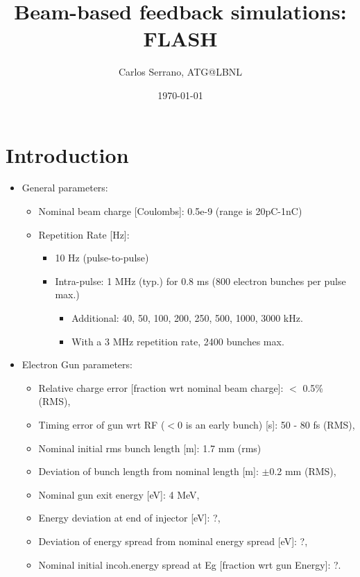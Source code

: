 \documentclass[a4paper,12pt]{article}
\title{Beam-based feedback simulations: FLASH}
\author{Carlos Serrano, ATG@LBNL}
\date{\today}
\begin{document}
\maketitle
\setcounter{tocdepth}{1}


\section{Introduction}

\begin{itemize}
  \item General parameters:
  \begin{itemize}
   \item Nominal beam charge [Coulombs]: 0.5e-9 (range is 20pC-1nC)
   \item Repetition Rate [Hz]:
   \begin{itemize}
    \item 10 Hz (pulse-to-pulse)
    \item Intra-pulse: 1 MHz (typ.) for 0.8 ms (800 electron bunches per pulse max.)
    \begin{itemize}
     \item Additional: 40, 50, 100, 200, 250, 500, 1000, 3000 kHz.
     \item With a 3 MHz repetition rate, 2400 bunches max.
    \end{itemize}
   \end{itemize}
  \end{itemize}
  \item Electron Gun parameters:
  \begin{itemize}
    \item Relative charge error [fraction wrt nominal beam charge]: $<$ 0.5\% (RMS),
    \item Timing error of gun wrt RF ($<$0 is an early bunch) [s]: 50 - 80 fs (RMS),
    \item Nominal initial rms bunch length [m]: 1.7 mm (rms)
    \item Deviation of bunch length from nominal length [m]: $\pm$0.2 mm (RMS),
    \item Nominal gun exit energy [eV]: 4 MeV,
    \item Energy deviation at end of injector [eV]: ?,
    \item Deviation of energy spread from nominal energy spread [eV]: ?,
    \item Nominal initial incoh.energy spread at Eg [fraction wrt gun Energy]: ?.
  \end{itemize}

\end{itemize}
\end{document}
